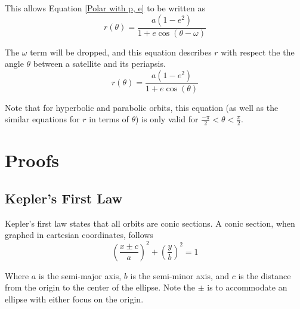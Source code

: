 \documentclass{article}
\begin{document}
This allows Equation \eqref{Polar with p, e} to be written as
\begin{equation*}
    r(\theta)=\frac{a(1-e^2)}{1+e\cos(\theta-\omega)}
\end{equation*}

The $\omega$ term will be dropped, and this equation describes $r$ with respect the the angle $\theta$ between a satellite and its periapsis.
\begin{equation}\label{Polar Final}
    r(\theta)=\frac{a(1-e^2)}{1+e\cos(\theta)}
\end{equation}

Note that for hyperbolic and parabolic orbits, this equation (as well as the similar equations for $r$ in terms of $\theta$) is only valid for $\frac{-\pi}{2}<\theta<\frac{\pi}{2}$.

\section{Proofs}

\bigskip\bigskip
\subsection{Kepler's First Law}\label{sec:Kepler's First Law}

Kepler's first law states that all orbits are conic sections. A conic section, when graphed in cartesian coordinates, follows
$$\left(\frac{x\pm{}c}{a}\right)^2+\left(\frac{y}{b}\right)^2=1$$

Where $a$ is the semi-major axis, $b$ is the semi-minor axis, and $c$ is the distance from the origin to the center of the ellipse. Note the $\pm$ is to accommodate an ellipse with either focus on the origin.
\end{document}
